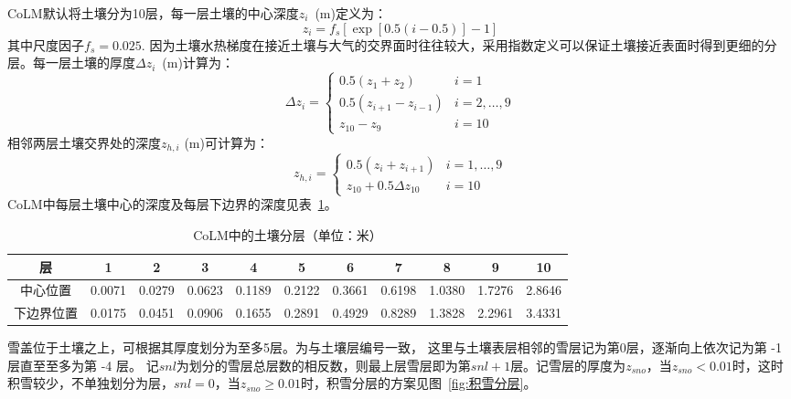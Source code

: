 CoLM默认将土壤分为10层，每一层土壤的中心深度$z_i$~(m)定义为：
\begin{equation}
z_{i} = f_{s}\left[ \exp{\left\lbrack 0.5(i - 0.5) \right\rbrack - 1} \right]
\end{equation}
其中尺度因子$f_s=0.025$. 因为土壤水热梯度在接近土壤与大气的交界面时往往较大，采用指数定义可以保证土壤接近表面时得到更细的分层。每一层土壤的厚度$\Delta z_i$~(m)计算为：
\begin{equation}
\Delta z_{i}=\left\{\begin{array}{ll}0.5\left(z_{1}+z_{2}\right) & i=1 \\
0.5\left(z_{i+1}-z_{i-1}\right) & i=2, \ldots, 9 \\ 
z_{10}-z_{9} & i=10\end{array}\right.
\end{equation}
相邻两层土壤交界处的深度$z_{h,i}$ (m)可计算为：
\begin{equation}
z_{h, i}=\left\{\begin{array}{ll}0.5\left(z_{i}+z_{i+1}\right) & i=1, \ldots, 9 \\
z_{10}+0.5 \Delta z_{10} & i=10\end{array}\right.
\end{equation}
CoLM中每层土壤中心的深度及每层下边界的深度见表~\ref{table:土壤分层}。

\begin{table}[b]
\caption{CoLM中的土壤分层（单位：米）} \label{table:土壤分层}
\centering \renewcommand{\arraystretch}{1.2} \footnotesize
\begin{tabular}{ccccccccccc}
\toprule
层 & 1 & 2 & 3 & 4 & 5 & 6 & 7 & 8 & 9 & 10 \\
\midrule
中心位置 & 0.0071 & 0.0279 & 0.0623 & 0.1189 & 0.2122 & 0.3661 & 0.6198 & 1.0380 & 1.7276 & 2.8646 \\
下边界位置 & 0.0175 & 0.0451 & 0.0906 & 0.1655 & 0.2891 & 0.4929 & 0.8289 & 1.3828 & 2.2961 & 3.4331 \\
\bottomrule
\end{tabular} 
\end{table}


雪盖位于土壤之上，可根据其厚度划分为至多5层。为与土壤层编号一致，
这里与土壤表层相邻的雪层记为第0层，逐渐向上依次记为第 -1 层直至至多为第 -4 层。
记$snl$为划分的雪层总层数的相反数，则最上层雪层即为第$snl+1$层。记雪层的厚度为$z_{sno}$，当$z_{sno}<0.01$时，这时积雪较少，不单独划分为层，$snl=0$，当$z_{sno}\geqslant 0.01$时，积雪分层的方案见图~\ref{fig:积雪分层}。

